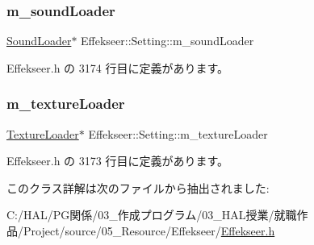 \mbox{\label{class_effekseer_1_1_setting_a1da02ce0c370b60c2fa5a0d76e85eeb6}} 
\subsubsection{\texorpdfstring{m\+\_\+sound\+Loader}{m\_soundLoader}}
{\footnotesize\ttfamily \mbox{\hyperlink{class_effekseer_1_1_sound_loader}{Sound\+Loader}}$\ast$ Effekseer\+::\+Setting\+::m\+\_\+sound\+Loader\hspace{0.3cm}{\ttfamily [private]}}



 Effekseer.\+h の 3174 行目に定義があります。

\mbox{\label{class_effekseer_1_1_setting_a05cf55c34e1d640e2080f15b3478ea0b}} 
\subsubsection{\texorpdfstring{m\+\_\+texture\+Loader}{m\_textureLoader}}
{\footnotesize\ttfamily \mbox{\hyperlink{class_effekseer_1_1_texture_loader}{Texture\+Loader}}$\ast$ Effekseer\+::\+Setting\+::m\+\_\+texture\+Loader\hspace{0.3cm}{\ttfamily [private]}}



 Effekseer.\+h の 3173 行目に定義があります。



このクラス詳解は次のファイルから抽出されました\+:\begin{DoxyCompactItemize}
\item 
C\+:/\+H\+A\+L/\+P\+G関係/03\+\_\+作成プログラム/03\+\_\+\+H\+A\+L授業/就職作品/\+Project/source/05\+\_\+\+Resource/\+Effekseer/\mbox{\hyperlink{_effekseer_8h}{Effekseer.\+h}}\end{DoxyCompactItemize}
